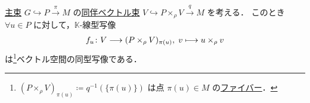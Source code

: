 \documentclass[TQFT_main]{subfiles}
\begin{document}
\begin{mylem}[label=lem:assoc-basic,breakable]{}
    \hyperref[def.PFD]{主束} $G \hookrightarrow P \xrightarrow{\pi} M$ の\hyperref[def:associated-vect]{同伴ベクトル束} $V \hookrightarrow P \times_\rho V \xrightarrow{q} M$ を考える．
    このとき $\forall u \in P$ に対して，$\mathbb{K}$-線型写像
    \begin{align}
        f_u \colon V \longrightarrow (P \times_\rho V)_{\pi(u)},\; v \longmapsto u \times_\rho v
    \end{align}
    は\footnote{$(P \times_\rho V)_{\pi(u)} \coloneqq q^{-1}(\{\pi(u)\})$ は点 $\pi(u) \in M$ の\hyperref[def.fiber-1]{ファイバー}．}ベクトル空間の同型写像である．
\end{mylem}
\end{document}
